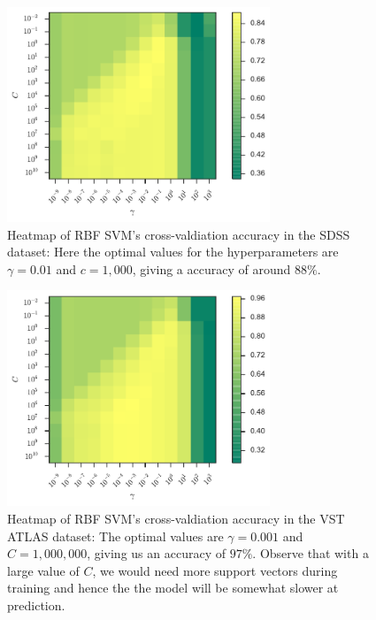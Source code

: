 \begin{figure}[p]
	\centering
	\includegraphics[width=0.7\textwidth]{figures/4_expt1/sdss_grid_rbf}
	\caption[Heatmap of RBF SVM's cross-valdiation accuracy in SDSS]{
		Heatmap of RBF SVM's cross-valdiation accuracy in the SDSS dataset:
		Here the optimal values for the hyperparameters are $\gamma=0.01$
		and $c = 1,000$, giving a accuracy of around $88\%$.}
	\label{fig:sdss_grid_rbf}
\end{figure}

\begin{figure}[p]
	\centering
	\includegraphics[width=0.7\textwidth]{figures/4_expt1/vstatlas_grid_rbf}
	\caption[Heatmap of RBF SVM's cross-valdiation accuracy in VST ATLAS]{
		Heatmap of RBF SVM's cross-valdiation accuracy in the VST ATLAS dataset:
		The optimal values are $\gamma=0.001$ and $C = 1,000,000$, giving us an accuracy
		of $97\%$. Observe that
		with a large value of $C$, we would need more support vectors during training
		and hence the the model will be somewhat slower at prediction.}
	\label{fig:vstatlas_grid_rbf}
\end{figure}


